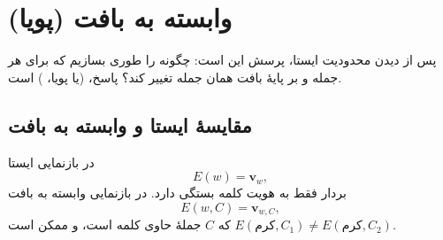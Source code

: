 \section{ وابسته به بافت (پویا)}

پس از دیدن محدودیت  ایستا، پرسش این است: چگونه  را طوری بسازیم که برای هر جمله و بر پایهٔ بافت همان جمله تغییر کند؟ پاسخ،  (یا پویا، ) است.

\subsection{مقایسهٔ ایستا و وابسته به بافت}
در بازنمایی ایستا
\[
E(w)=\mathbf{v}_w,
\]
بردار فقط به هویت کلمه بستگی دارد. در بازنمایی وابسته به بافت
\[
E(w,C)=\mathbf{v}_{w,C},
\]
که $C$ جملهٔ حاوی کلمه است، و ممکن است $E(\text{کرم},C_1)\neq E(\text{کرم},C_2)$.

